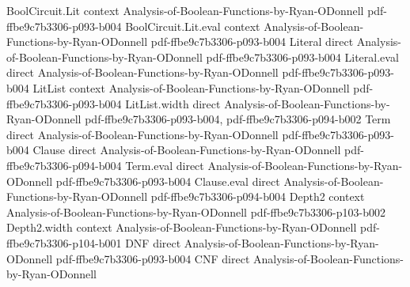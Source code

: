 \begin{theorem}
\leanok
{}
\proofstep
  {BoolCircuit.Lit}
  {context}
  {Analysis-of-Boolean-Functions-by-Ryan-ODonnell}
  {pdf-ffbe9c7b3306-p093-b004}
\proofstep
  {BoolCircuit.Lit.eval}
  {context}
  {Analysis-of-Boolean-Functions-by-Ryan-ODonnell}
  {pdf-ffbe9c7b3306-p093-b004}
\proofstep
  {Literal}
  {direct}
  {Analysis-of-Boolean-Functions-by-Ryan-ODonnell}
  {pdf-ffbe9c7b3306-p093-b004}
\proofstep
  {Literal.eval}
  {direct}
  {Analysis-of-Boolean-Functions-by-Ryan-ODonnell}
  {pdf-ffbe9c7b3306-p093-b004}
\proofstep
  {LitList}
  {context}
  {Analysis-of-Boolean-Functions-by-Ryan-ODonnell}
  {pdf-ffbe9c7b3306-p093-b004}
\proofstep
  {LitList.width}
  {direct}
  {Analysis-of-Boolean-Functions-by-Ryan-ODonnell}
  {pdf-ffbe9c7b3306-p093-b004,
    pdf-ffbe9c7b3306-p094-b002}
\proofstep
  {Term}
  {direct}
  {Analysis-of-Boolean-Functions-by-Ryan-ODonnell}
  {pdf-ffbe9c7b3306-p093-b004}
\proofstep
  {Clause}
  {direct}
  {Analysis-of-Boolean-Functions-by-Ryan-ODonnell}
  {pdf-ffbe9c7b3306-p094-b004}
\proofstep
  {Term.eval}
  {direct}
  {Analysis-of-Boolean-Functions-by-Ryan-ODonnell}
  {pdf-ffbe9c7b3306-p093-b004}
\proofstep
  {Clause.eval}
  {direct}
  {Analysis-of-Boolean-Functions-by-Ryan-ODonnell}
  {pdf-ffbe9c7b3306-p094-b004}
\proofstep
  {Depth2}
  {context}
  {Analysis-of-Boolean-Functions-by-Ryan-ODonnell}
  {pdf-ffbe9c7b3306-p103-b002}
\proofstep
  {Depth2.width}
  {context}
  {Analysis-of-Boolean-Functions-by-Ryan-ODonnell}
  {pdf-ffbe9c7b3306-p104-b001}
\proofstep
  {DNF}
  {direct}
  {Analysis-of-Boolean-Functions-by-Ryan-ODonnell}
  {pdf-ffbe9c7b3306-p093-b004}
\proofstep
  {CNF}
  {direct}
  {Analysis-of-Boolean-Functions-by-Ryan-ODonnell}

\end{theorem}
